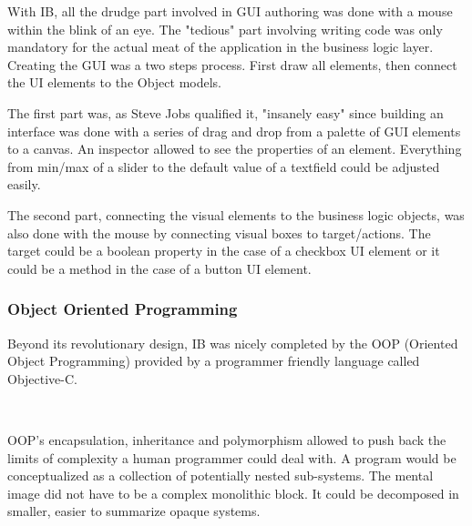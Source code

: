 \vspace{-4mm}
 With IB, all the drudge part involved in GUI authoring was done with a mouse within the blink of an eye. The "tedious" part involving writing code was only mandatory for the actual meat of the application in the business logic layer. Creating the GUI was a two steps process. First draw all elements, then connect the UI elements to the Object models.\\
\par
The first part was, as Steve Jobs qualified it, "insanely easy" since building an interface was done with a series of drag and drop from a palette of GUI elements to a canvas. An inspector allowed to see the properties of an element. Everything from min/max of a slider to the default value of a textfield could be adjusted easily.\\
\par
The second part, connecting the visual elements to the business logic objects, was also done with the mouse by connecting visual boxes to target/actions. The target could be a boolean property in the case of a checkbox UI element or it could be a method in the case of a button UI element.

\subsubsection{Object Oriented Programming}
Beyond its revolutionary design, IB was nicely completed by the OOP (Oriented Object Programming) provided by a programmer friendly language called Objective-C.\\
\par
{}\\
\par
OOP's encapsulation, inheritance and polymorphism allowed to push back the limits of complexity a human programmer could deal with. A program would be conceptualized as a collection of potentially nested sub-systems. The mental image did not have to be a complex monolithic block. It could be decomposed in smaller, easier to summarize opaque systems.\\

